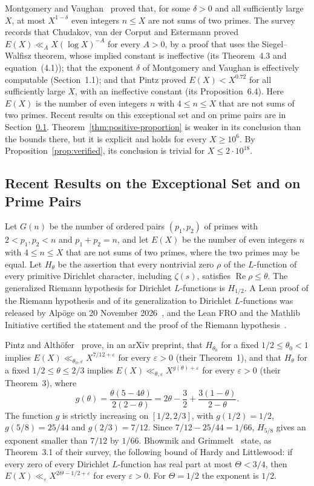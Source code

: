 \documentclass[11pt]{amsart}
\theoremstyle{definition}
\theoremstyle{remark}
\begin{document}
Montgomery and Vaughan~\cite{montgomery1975exceptional} proved that, for some $\delta>0$ and all sufficiently large $X$, at most $X^{1-\delta}$ even integers $n\leq X$ are not sums of two primes. The survey~\cite{bhowmik2026exceptional} records that Chudakov, van der Corput and Estermann proved $E(X)\ll_A X(\log X)^{-A}$ for every $A>0$, by a proof that uses the Siegel--Walfisz theorem, whose implied constant is ineffective (its Theorem~4.3 and equation~(4.1)); that the exponent $\delta$ of Montgomery and Vaughan is effectively computable (Section~1.1); and that Pintz proved $E(X)<X^{0.72}$ for all sufficiently large $X$, with an ineffective constant (its Proposition~6.4). Here $E(X)$ is the number of even integers $n$ with $4\leq n\leq X$ that are not sums of two primes. Recent results on this exceptional set and on prime pairs are in Section~\ref{subsec:recent}. Theorem~\ref{thm:positive-proportion} is weaker in its conclusion than the bounds there, but it is explicit and holds for every $X\geq 10^6$. By Proposition~\ref{prop:verified}, its conclusion is trivial for $X\leq 2\cdot 10^{18}$.

\subsection{Recent Results on the Exceptional Set and on Prime Pairs}\label{subsec:recent}
Let $G(n)$ be the number of ordered pairs $(p_1,p_2)$ of primes with $2<p_1,p_2<n$ and $p_1+p_2=n$, and let $E(X)$ be the number of even integers $n$ with $4\leq n\leq X$ that are not sums of two primes, where the two primes may be equal. Let $H_\theta$ be the assertion that every nontrivial zero $\rho$ of the $L$-function of every primitive Dirichlet character, including $\zeta(s)$, satisfies $\operatorname{Re}\rho\leq\theta$. The generalized Riemann hypothesis for Dirichlet $L$-functions is $H_{1/2}$. A Lean proof of the Riemann hypothesis and of its generalization to Dirichlet $L$-functions was released by Alp\"oge on 20 November 2026~\cite{alpoge2026}, and the Lean FRO and the Mathlib Initiative certified the statement and the proof of the Riemann hypothesis~\cite{leanfro2026}.

Pintz and Alth\"ofer~\cite{pintz2026exceptional} prove, in an arXiv preprint, that $H_{\theta_0}$ for a fixed $1/2\leq\theta_0<1$ implies $E(X)\ll_{\theta_0,\varepsilon}X^{7/12+\varepsilon}$ for every $\varepsilon>0$ (their Theorem~1), and that $H_\theta$ for a fixed $1/2\leq\theta\leq 2/3$ implies $E(X)\ll_{\theta,\varepsilon}X^{g(\theta)+\varepsilon}$ for every $\varepsilon>0$ (their Theorem~3), where
\[
g(\theta)=\frac{\theta(5-4\theta)}{2(2-\theta)}=2\theta-\frac32+\frac{3(1-\theta)}{2-\theta}.
\]
The function $g$ is strictly increasing on $[1/2,2/3]$, with $g(1/2)=1/2$, $g(5/8)=25/44$ and $g(2/3)=7/12$. Since $7/12-25/44=1/66$, $H_{5/8}$ gives an exponent smaller than $7/12$ by $1/66$. Bhowmik and Grimmelt~\cite{bhowmik2026exceptional} state, as Theorem~3.1 of their survey, the following bound of Hardy and Littlewood: if every zero of every Dirichlet $L$-function has real part at most $\Theta<3/4$, then $E(X)\ll_\varepsilon X^{2\Theta-1/2+\varepsilon}$ for every $\varepsilon>0$. For $\Theta=1/2$ the exponent is $1/2$.
\end{document}
